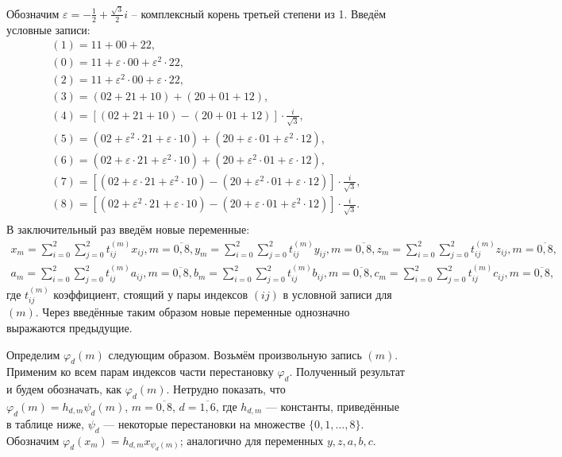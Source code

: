 \documentclass[12pt]{article}
\begin{document}
    Обозначим $\varepsilon = -\frac 12 + \frac{\sqrt{3}}{2} i$ -- комплексный корень третьей степени из 1.
    Введём условные записи:
    \begin{gather*}
    (1)
        =11+00+22,\\
        (0)=11+\varepsilon\cdot 00+\varepsilon^2\cdot 22,\\
        (2)=11+\varepsilon^2\cdot 00+\varepsilon\cdot 22,\\
        (3)=(02+21+10)+(20+01+12),\\
        (4)=[(02+21+10)-(20+01+12)]\cdot \frac{i}{\sqrt{3}},\\
        (5)=(02+\varepsilon^2\cdot 21+\varepsilon\cdot 10)+(20+\varepsilon\cdot 01+\varepsilon^2\cdot 12),\\
        (6)=(02+\varepsilon\cdot 21+\varepsilon^2\cdot 10)+(20+\varepsilon^2\cdot 01+\varepsilon\cdot 12),\\
        (7)=[(02+\varepsilon\cdot 21+\varepsilon^2\cdot 10)-(20+\varepsilon^2\cdot 01+\varepsilon\cdot 12)]\cdot \frac{i}{\sqrt{3}},\\
        (8)=[(02+\varepsilon^2\cdot 21+\varepsilon\cdot 10)-(20+\varepsilon\cdot 01+\varepsilon^2\cdot 12)]\cdot \frac{i}{\sqrt{3}}.\\
    \end{gather*}
    В заключительный раз введём новые переменные:
    \begin{gather*}
        x_m= \sum_{i=0}^2 \sum_{j=0}^2 t_{ij}^{(m)} x_{ij}, m=\overline{0,8},
        y_m= \sum_{i=0}^2 \sum_{j=0}^2 t_{ij}^{(m)} y_{ij}, m=\overline{0,8},
        z_m= \sum_{i=0}^2 \sum_{j=0}^2 t_{ij}^{(m)} z_{ij}, m=\overline{0,8},\\
        a_m= \sum_{i=0}^2 \sum_{j=0}^2 t_{ij}^{(m)} a_{ij}, m=\overline{0,8},
        b_m= \sum_{i=0}^2 \sum_{j=0}^2 t_{ij}^{(m)} b_{ij}, m=\overline{0,8},
        c_m= \sum_{i=0}^2 \sum_{j=0}^2 t_{ij}^{(m)} c_{ij}, m=\overline{0,8},
    \end{gather*}
    где $ t_{ij}^{(m)} $ коэффициент, стоящий у пары индексов $ (ij) $ в условной записи для $ (m) $.
    Через введённые таким образом новые переменные однозначно выражаются предыдущие.

    Определим $ \varphi_d(m) $ следующим образом.
    Возьмём произвольную запись $ (m) $.
    Применим ко всем парам индексов части перестановку $ \varphi_d $.
    Полученный результат и будем обозначать, как $ \varphi_d(m) $.
    Нетрудно показать, что $ \varphi_d(m) = h_{d,m} \psi_d(m) $, $ m = \overline{0,8} $, $ d=\overline{1,6} $, где
    $ h_{d,m} $ --- константы, приведённые в таблице ниже, $ \psi_d $ --- некоторые перестановки на множестве $ \{0, 1, \dots, 8\} $.
    Обозначим $ \varphi_d(x_m) = h_{d,m} x_{\psi_d(m)} $; аналогично для переменных $ y, z, a, b, c $.
\end{document}
